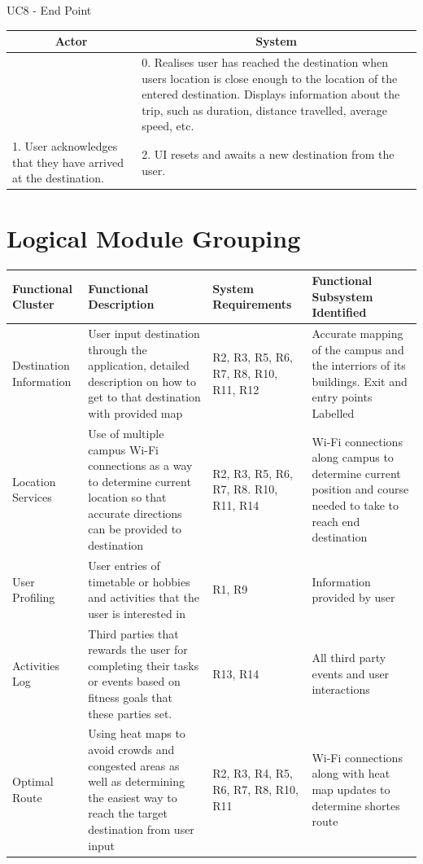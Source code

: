\documentclass[a4paper, 12pt, one column, aas_macros]{article}
\begin{document}
  UC8 - End Point \hfill \break
  \begin{tabular}{ |p{5.5cm}|p{5.5cm}| }
    \hline
    \multicolumn{1}{|c|}{Actor} & \multicolumn{1}{c|}{System} \\ \hline
     &0. Realises user has reached the destination when users location is close enough to the location of the entered destination. Displays information about the trip, such as duration, distance travelled, average speed, etc.\\ \hline
     1. User acknowledges that they have arrived at the destination.&2. UI resets and awaits a new destination from the user.\\ \hline
  \end{tabular}

\clearpage
\section{Logical Module Grouping}

\begin{table}[hb]
\centering
\bigskip
	\begin{tabular}{|p{1.25in}|p{1.3in}|p{0.7in}|p{1.3in}|}
	\hline
		Functional Cluster & Functional Description & System Requirements & Functional Subsystem 			Identified\\
	\hline
		Destination Information & User input destination through the application, detailed description on how to get to 		that destination with provided map & R2, R3, R5, R6, R7, R8, R10, R11, R12 & Accurate mapping of the campus and 		the interriors of its buildings. Exit and entry points Labelled\\
	\hline
		Location Services & Use of multiple campus Wi-Fi connections as a way to determine current location so that 			accurate directions can be provided to destination & R2, R3, R5, R6, R7, R8. R10, R11, R14 & Wi-Fi connections 			along campus to determine current position and course needed to take to reach end destination\\
	\hline
		User Profiling & User entries of timetable or hobbies and activities that the user is interested in & R1, R9 & 			Information provided by user\\
	\hline
		Activities Log & Third parties that rewards the user for completing their tasks or events based on fitness goals 		that these parties set. & R13, R14 & All third party events and user interactions\\
	\hline
		Optimal Route & Using heat maps to avoid crowds and congested areas as well as determining the easiest way to 			reach the target destination from user input & R2, R3, R4, R5, R6, R7, R8, R10, R11 & Wi-Fi connections along 			with heat map updates to determine shortes route\\
	\hline
	\end{tabular}
\end{table}
\end{document}
